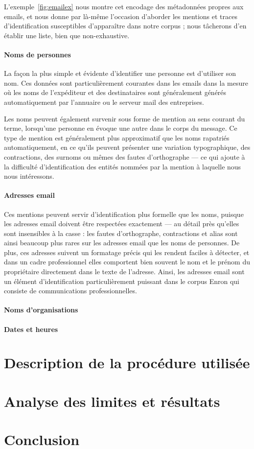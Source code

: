 \documentclass[11pt]{article}
\begin{document}
L'exemple~\ref{fig:emailex} nous montre cet encodage des métadonnées propres aux
emails, et nous donne par là-même l'occasion d'aborder les mentions et traces
d'identification susceptibles d'apparaître dans notre corpus ; nous tâcherons
d'en établir une liste, bien que non-exhaustive.

\paragraph{Noms de personnes}

La façon la plus simple et évidente d'identifier une personne est d'utiliser son
nom. Ces données sont particulièrement courantes dans les emails dans la mesure
où les noms de l'expéditeur et des destinataires sont généralement générés
automatiquement par l'annuaire ou le serveur mail des entreprises.

Les noms peuvent également survenir sous forme de mention au sens courant du
terme, lorsqu'une personne en évoque une autre dans le corps du message. Ce type
de mention est généralement plus approximatif que les noms rapatriés
automatiquement, en ce qu'ils peuvent présenter une variation typographique, des
contractions, des surnoms ou mêmes des fautes d'orthographe --- ce qui ajoute
à la difficulté d'identification des entités nommées par la mention à laquelle
nous nous intéressons.

\paragraph{Adresses email}

Ces mentions peuvent servir d'identification plus formelle que les noms, puisque
les adresses email doivent être respectées exactement --- au détail près
qu'elles sont insensibles à la casse : les fautes d'orthographe, contractions
et alias sont ainsi beaucoup plus rares sur les adresses email que les noms
de personnes. De plus, ces adresses suivent un formatage précis qui les rendent
faciles à détecter, et dans un cadre professionnel elles comportent bien souvent
le nom et le prénom du propriétaire directement dans le texte de l'adresse.
Ainsi, les adresses email sont un élément d'identification particulièrement
puissant dans le corpus Enron qui consiste de communications professionnelles.

\paragraph{Noms d'organisations}

\paragraph{Dates et heures}

\section{Description de la procédure utilisée}

\section{Analyse des limites et résultats}

\section*{Conclusion}

\newpage
\tableofcontents
\end{document}
